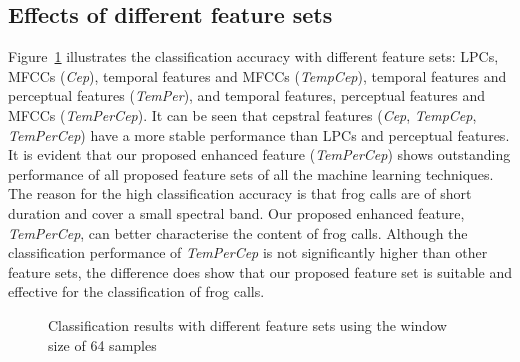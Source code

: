 %
%

\subsection{Effects of different feature sets}
Figure~\ref{diffFeature} illustrates the classification accuracy with different feature sets: LPCs, MFCCs (\textit{Cep}), temporal features and MFCCs (\textit{TempCep}), temporal features and perceptual features (\textit{TemPer}), and temporal features, perceptual features and MFCCs (\textit{TemPerCep}). It can be seen that cepstral features (\textit{Cep}, \textit{TempCep}, \textit{TemPerCep}) have a more stable performance than LPCs and perceptual features. It is evident that our proposed enhanced feature (\textit{TemPerCep}) shows outstanding performance of all proposed feature sets of all the machine learning techniques. The reason for the high classification accuracy is that frog calls are of short duration and cover a small spectral band. Our proposed enhanced feature, \textit{TemPerCep}, can better characterise the content of frog calls. Although the classification performance of \textit{TemPerCep} is not significantly higher than other feature sets, the difference does show that our proposed feature set is suitable and effective for the classification of frog calls.   


\begin{figure}[htb!] %
\caption{Classification results with different feature sets using the window size of 64 samples}
\label{diffFeature} 
\end{figure}



